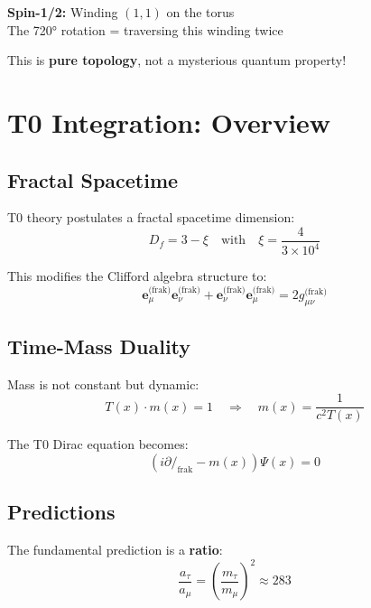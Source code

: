 	\textbf{Spin-1/2:} Winding $(1, 1)$ on the torus \\
	The 720° rotation = traversing this winding twice
	
	This is \textbf{pure topology}, not a mysterious quantum property!
	
	\section{T0 Integration: Overview}
	
	\subsection{Fractal Spacetime}
	
	T0 theory postulates a fractal spacetime dimension:
	\begin{equation}
		D_f = 3 - \xi \quad \text{with} \quad \xi = \frac{4}{3 \times 10^4}
	\end{equation}
	
	This modifies the Clifford algebra structure to:
	\begin{equation}
		\mathbf{e}_\mu^{\text{(frak)}} \mathbf{e}_\nu^{\text{(frak)}} + 
		\mathbf{e}_\nu^{\text{(frak)}} \mathbf{e}_\mu^{\text{(frak)}} = 
		2 g_{\mu\nu}^{\text{(frak)}}
	\end{equation}
	
	\subsection{Time-Mass Duality}
	
	Mass is not constant but dynamic:
	\begin{equation}
		T(x) \cdot m(x) = 1 \quad \Rightarrow \quad m(x) = \frac{1}{c^2 T(x)}
	\end{equation}
	
	The T0 Dirac equation becomes:
	\begin{equation}
		(i \partial\!\!\!/_{\text{frak}} - m(x))\Psi(x) = 0
	\end{equation}
	
	\subsection{Predictions}
	
	The fundamental prediction is a \textbf{ratio}:
	\begin{equation}
		\boxed{\frac{a_\tau}{a_\mu} = \left(\frac{m_\tau}{m_\mu}\right)^2 \approx 283}
	\end{equation}
	
